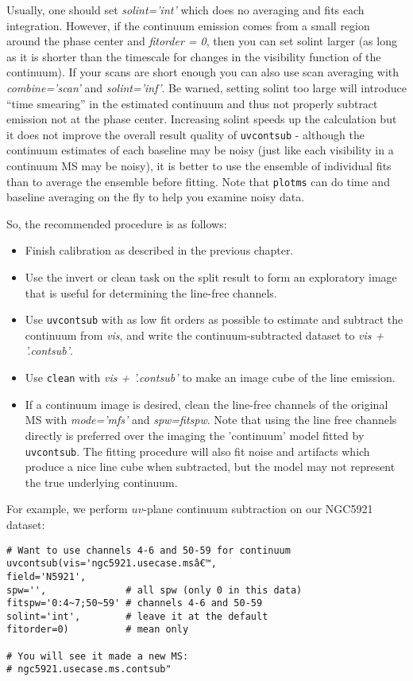 Usually, one should set {\it solint='int'} which does no averaging and fits
each integration. However, if the continuum emission comes from a small
region around the phase center and {\it fitorder = 0}, then you can set solint
larger (as long as it is shorter than the timescale for changes in the
visibility function of the continuum).  If your scans are short enough you
can also use scan averaging with {\it combine='scan'} and {\it solint='inf'}. 
Be warned, setting solint too
large will introduce ``time smearing'' in the estimated continuum and thus
not properly subtract emission not at the phase center.  Increasing solint
speeds up the calculation but it does not improve the overall result
quality of {\tt uvcontsub} - although the continuum estimates of each baseline
may be noisy (just like each visibility in a continuum MS may be noisy),
it is better to use the ensemble of individual fits than to average the
ensemble before fitting.  Note that {\tt plotms} can do time and baseline
averaging on the fly to help you examine noisy data.


So, the recommended procedure is as follows:
\begin{itemize}
\item Finish calibration as described in the previous chapter.
\item Use the invert or clean task on the split result to form an exploratory
  image that is useful for determining the line-free channels.
\item Use {\tt uvcontsub} with as low fit orders as possible to estimate and subtract the
  continuum from {\it vis}, and write the continuum-subtracted dataset
  to {\it vis + '.contsub'}.
\item Use {\tt clean} with {\it vis + '.contsub'} to make an image cube of the line emission.
\item If a continuum image is desired, clean the line-free channels of the
  original MS with {\it mode='mfs'} and {\it spw=fitspw}. Note that
  using the line free channels directly is preferred over the imaging
  the 'continuum' model fitted by {\tt uvcontsub}. The fitting
  procedure will also fit noise and artifacts which produce a nice
  line cube when subtracted, but the model may not represent the true
  underlying continuum.   
\end{itemize}

For example, we perform $uv$-plane continuum subtraction on our NGC5921
dataset:
\small
\begin{verbatim}
# Want to use channels 4-6 and 50-59 for continuum
uvcontsub(vis='ngc5921.usecase.msâ€™,
field='N5921',
spw='',              # all spw (only 0 in this data)
fitspw='0:4~7;50~59' # channels 4-6 and 50-59
solint='int',        # leave it at the default
fitorder=0)          # mean only

# You will see it made a new MS:
# ngc5921.usecase.ms.contsub"
\end{verbatim}
\normalsize

